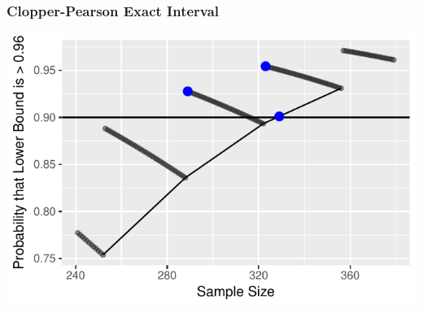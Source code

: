 \documentclass{beamer}\usepackage{knitr}
\begin{document}
\begin{frame}
\frametitle{Clopper-Pearson Exact Interval}
\begin{knitrout}
\color{fgcolor}

{\centering \includegraphics[width=\linewidth]{figure/plot_Exact_4-1} 

}



\end{knitrout}
\end{frame}




% 
% 
\end{document}
